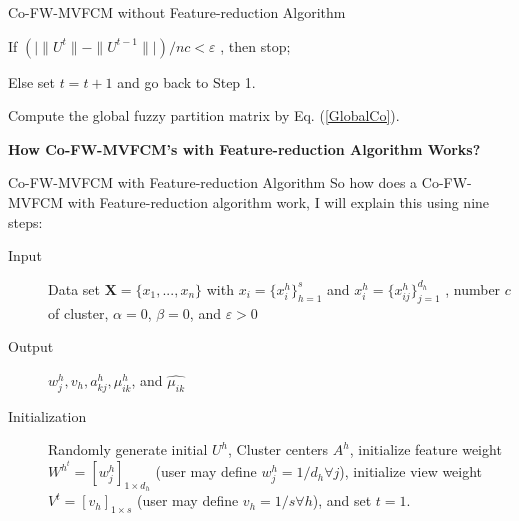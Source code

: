 \documentclass[compress,sky blue]{beamer}
\begin{document}
\begin{frame}{Co-FW-MVFCM without Feature-reduction Algorithm}
	\vspace{-0.3cm}	
\begin{description}

\item[Step 6]
If  $\left(\Big|\|U^{t}\|-\|U^{t-1}\|\Big|\right)\Big/nc<\varepsilon$ , then stop;
\item 
Else set $t=t+1$  and go back to Step 1. 
\item[Step 7]
Compute the global fuzzy partition matrix   by Eq. (\ref{GlobalCo}).
\end{description}
\end{frame}


\begin{frame}{}
    \centering
\Huge{\textbf{How Co-FW-MVFCM's with Feature-reduction Algorithm Works?}}
\end{frame}

\begin{frame}{Co-FW-MVFCM  with Feature-reduction Algorithm}
	\vspace{-0.3cm}	
So how does a Co-FW-MVFCM with Feature-reduction algorithm work, I will explain this using nine  steps:
\begin{description}
\item [Input]
Data set $\boldsymbol{X}=\{ x_{1},. . .,x_{n} \}$ with $x_{i}=\{ x_{i}^{h} \}_{h=1}^{s}$ and $x_{i}^{h}=\{ x_{ij}^{h} \}_{j=1}^{d_{h}}$ , number $c$ of cluster, $\alpha=0$, $\beta=0$, and $\varepsilon>0$
\item[Output]
$w_{j}^{h}, v_{h}, a_{kj}^{h}, \mu_{ik}^{h}$, and $\hat{\mu_{ik}}$
\item[Initialization]
Randomly generate initial $U^{h}$, Cluster centers $A^{h}$, initialize feature weight $W^{h^{t}}=[w_{j}^{h}]_{1\times d_{h}}$ (user may define $w_{j}^{h}=1/d_{h}\forall j$), initialize view weight $V^{t}=[v_{h}]_{1\times s}$ (user may define $v_{h}=1/s\forall h$), and set $t=1.$
\end{description}
\end{frame}
\end{document}
